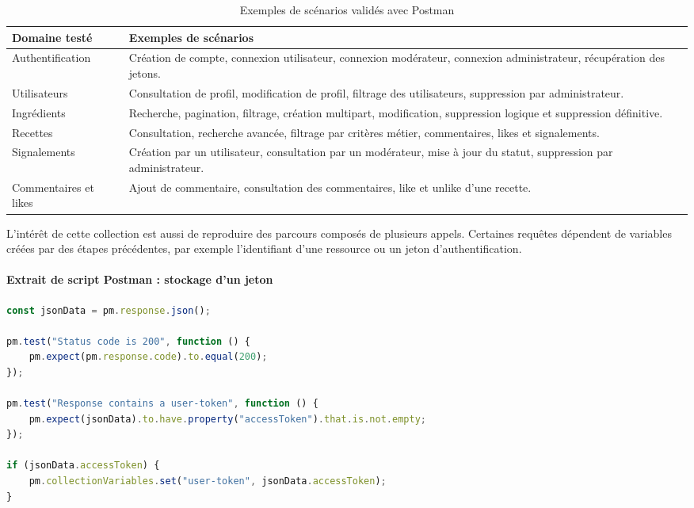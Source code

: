\begin{table}[H]
\centering
\begin{tabular}{p{4cm} p{10cm}}
\toprule
\textbf{Domaine testé} & \textbf{Exemples de scénarios} \\
\midrule
Authentification & Création de compte, connexion utilisateur, connexion modérateur, connexion administrateur, récupération des jetons. \\
Utilisateurs & Consultation de profil, modification de profil, filtrage des utilisateurs, suppression par administrateur. \\
Ingrédients & Recherche, pagination, filtrage, création multipart, modification, suppression logique et suppression définitive. \\
Recettes & Consultation, recherche avancée, filtrage par critères métier, commentaires, likes et signalements. \\
Signalements & Création par un utilisateur, consultation par un modérateur, mise à jour du statut, suppression par administrateur. \\
Commentaires et likes & Ajout de commentaire, consultation des commentaires, like et unlike d'une recette. \\
\bottomrule
\end{tabular}
\caption{Exemples de scénarios validés avec Postman}
\label{tab:tests-postman-feastverse}
\end{table}

L'intérêt de cette collection est aussi de reproduire des parcours composés de plusieurs appels. Certaines requêtes dépendent de variables créées par des étapes précédentes, par exemple l'identifiant d'une ressource ou un jeton d'authentification.

\paragraph{Extrait de script Postman : stockage d'un jeton }

\begin{lstlisting}[language=JavaScript,caption={Script Postman de vérification et de stockage du token},label={lst:feastverse-postman-token}]
const jsonData = pm.response.json();

pm.test("Status code is 200", function () {
    pm.expect(pm.response.code).to.equal(200);
});

pm.test("Response contains a user-token", function () {
    pm.expect(jsonData).to.have.property("accessToken").that.is.not.empty;
});

if (jsonData.accessToken) {
    pm.collectionVariables.set("user-token", jsonData.accessToken);
}
\end{lstlisting}

